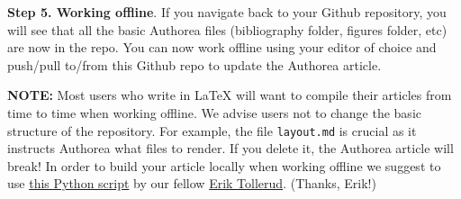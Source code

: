 \textbf{Step 5. Working offline}. If you navigate back to your Github repository, you will see that all the basic Authorea files (bibliography folder, figures folder, etc) are now in the repo. You can now work offline using your editor of choice and push/pull to/from this Github repo to update the Authorea article. 

\textbf{NOTE:} Most users who write in LaTeX will want to compile their articles from time to time when working offline. We advise users not to change the basic structure of the repository. For example, the file \verb|layout.md| is crucial as it instructs Authorea what files to render. If you delete it, the Authorea article will break! In order to build your article locally when working offline we suggest to use \href{https://gist.github.com/eteq/1d7b138b9c4e80231f6f}{this Python script} by our fellow \href{https://gist.github.com/eteq}{Erik Tollerud}. (Thanks, Erik!)
